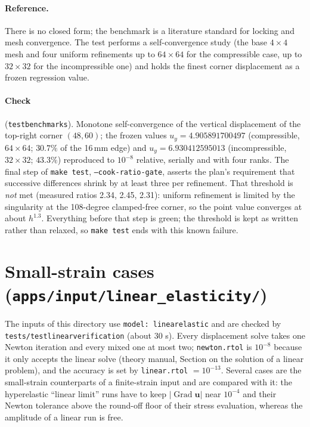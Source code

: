 \documentclass[11pt]{article}
\newcommand{\Grad}{\operatorname{Grad}}
\newcommand{\bu}{\bm{u}}
\DeclareRobustCommand{\code}[1]{{\def\_{\textunderscore\allowbreak}\texttt{#1}}}
\DeclareRobustCommand{\file}[1]{{\def\_{\textunderscore\allowbreak}\texttt{#1}}}
\begin{document}
\paragraph{Reference.}
There is no closed form; the benchmark is a literature standard for
locking and mesh convergence.  The test performs a self-convergence study
(the base $4\times4$ mesh and four uniform refinements up to $64\times64$
for the compressible case, up to $32\times32$ for the incompressible one)
and holds the finest corner displacement as a frozen regression value.

\paragraph{Check} (\file{test\_benchmarks}).  Monotone self-convergence of
the vertical displacement of the top-right corner $(48, 60)$; the frozen
values $u_y = 4.905891700497$ (compressible, $64\times64$; $30.7\%$ of the
16\,mm edge) and $u_y = 6.930412595013$ (incompressible, $32\times32$;
$43.3\%$) reproduced to $10^{-8}$ relative, serially and with four ranks.
The final step of \code{make test}, \code{--cook-ratio-gate}, asserts the
plan's requirement that successive differences shrink by at least three
per refinement.  That threshold is \emph{not} met (measured ratios 2.34,
2.45, 2.31): uniform refinement is limited by the singularity at the
108-degree clamped-free corner, so the point value converges at about
$h^{1.3}$.  Everything before that step is green; the threshold is kept
as written rather than relaxed, so \code{make test} ends with this known
failure.

\section{Small-strain cases (\texttt{apps/input/linear\_elasticity/})}
\label{sec:linearcases}

The inputs of this directory use \code{model: linear\_elastic} and are
checked by \file{tests/test\_linear\_verification} (about 30 s).  Every
displacement solve takes one Newton iteration and every mixed one at most
two; \code{newton.rtol} is $10^{-8}$ because it only accepts the linear
solve (theory manual, Section on the solution of a linear problem), and the
accuracy is set by \code{linear.rtol} $= 10^{-13}$.  Several cases are the
small-strain counterparts of a finite-strain input and are compared with
it: the hyperelastic ``linear limit'' runs have to keep $|\Grad\bu|$ near
$10^{-4}$ and their Newton tolerance above the round-off floor of their
stress evaluation, whereas the amplitude of a linear run is free.
\end{document}
